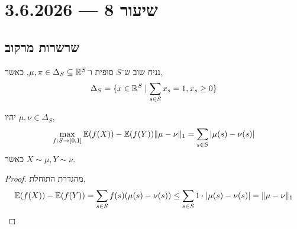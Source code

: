 \section{שיעור 8 --- 3.6.2026}
\subsection{שרשרות מרקוב}
נניח שוב ש־$S$ סופית ו־$\mu, \pi \in \Delta_S \subseteq \mathbb{R}^S$, כאשר,
\[
	\Delta_S
	= \{ x \in \mathbb{R}^S \mid \sum_{s \in S} x_s = 1, x_s \ge 0 \}
\]
\begin{proposition}
	יהיו $\mu, \nu \in \Delta_S$,
	\[
		\max_{f : S \to [0, 1]} \mathbb{E}(f(X)) - \mathbb{E}(f(Y))
		\lVert \mu - \nu \rVert_1
		= \sum_{s \in S} |\mu(s) - \nu(s)|
	\]
	כאשר $X \sim \mu, Y \sim \nu$.
\end{proposition}
\begin{proof}
	מהגדרת התוחלת,
	\[
		\mathbb{E}(f(X)) - \mathbb{E}(f(Y))
		= \sum_{s \in S} f(s) (\mu(s) - \nu(s))
		\le \sum_{s \in S} 1 \cdot |\mu(s) - \nu(s)|
		= \lVert \mu - \nu \rVert_1
	\]
\end{proof}

